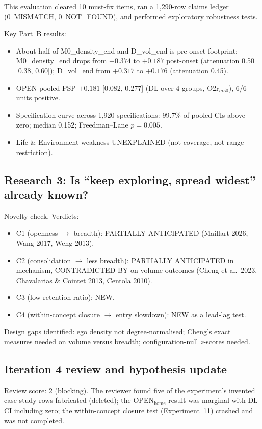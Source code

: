 \documentclass[11pt,letterpaper]{article}
\begin{document}
This evaluation cleared 10 must-fix items, ran a 1{,}290-row claims ledger (0~MISMATCH, 0~NOT\_FOUND), and performed exploratory robustness tests.

Key Part~B results:
\begin{itemize}
    \item About half of M0\_density\_end and D\_vol\_end is pre-onset footprint: M0\_density\_end drops from $+0.374$ to $+0.187$ post-onset (attenuation 0.50 [0.38, 0.60]); D\_vol\_end from $+0.317$ to $+0.176$ (attenuation 0.45).
    \item OPEN pooled PSP $+0.181$ [0.082, 0.277] (DL over 4 groups, O2r$_{m50}$), 6/6 units positive.
    \item Specification curve across 1{,}920 specifications: 99.7\% of pooled CIs above zero; median 0.152; Freedman--Lane $p = 0.005$.
    \item Life \& Environment weakness UNEXPLAINED (not coverage, not range restriction).
\end{itemize}

\subsection{Research 3: Is ``keep exploring, spread widest'' already known?}

Novelty check. Verdicts:
\begin{itemize}
    \item C1 (openness $\to$ breadth): PARTIALLY ANTICIPATED (Maillart 2026, Wang 2017, Weng 2013).
    \item C2 (consolidation $\to$ less breadth): PARTIALLY ANTICIPATED in mechanism, CONTRADICTED-BY on volume outcomes (Cheng et al.\ 2023, Chavalarias \& Cointet 2013, Centola 2010).
    \item C3 (low retention ratio): NEW.
    \item C4 (within-concept closure $\to$ entry slowdown): NEW as a lead-lag test.
\end{itemize}

Design gaps identified: ego density not degree-normalised; Cheng's exact measures needed on volume versus breadth; configuration-null $z$-scores needed.

\subsection{Iteration 4 review and hypothesis update}

Review score: 2 (blocking). The reviewer found five of the experiment's invented case-study rows fabricated (deleted); the OPEN$_{\text{home}}$ result was marginal with DL CI including zero; the within-concept closure test (Experiment~11) crashed and was not completed.
\end{document}
